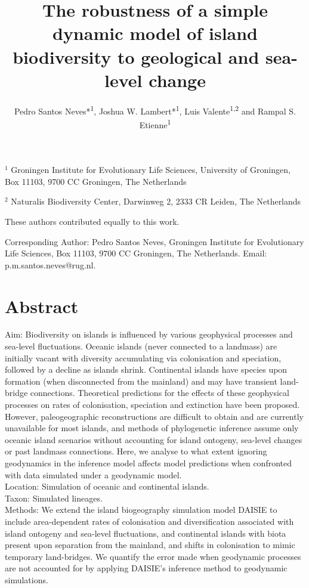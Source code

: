 \documentclass{article}
\title{The robustness of a simple dynamic model of island biodiversity to geological and sea-level change}
\author{Pedro Santos Neves*\textsuperscript{1}, Joshua W. Lambert*\textsuperscript{1}, Luis Valente\textsuperscript{1,2} and Rampal S. Etienne\textsuperscript{1}}
\date{}
\begin{document}
\maketitle

\noindent $^{1}$ Groningen Institute for Evolutionary Life Sciences, University of
Groningen, Box 11103, 9700 CC Groningen, The Netherlands

\noindent $^{2}$ Naturalis Biodiversity Center, Darwinweg 2, 2333 CR Leiden, The Netherlands 

\noindent * These authors contributed equally to this work.

\noindent Corresponding Author: Pedro Santos Neves, Groningen Institute for Evolutionary Life Sciences, Box 11103, 9700 CC Groningen, The Netherlands. Email: p.m.santos.neves@rug.nl.

\section*{Abstract}

Aim: Biodiversity on islands is influenced by various geophysical processes and sea-level fluctuations. Oceanic islands (never connected to a landmass) are initially vacant with diversity accumulating via colonisation and speciation, followed by a decline as islands shrink. Continental islands have species upon formation (when disconnected from the mainland) and may have transient land-bridge connections. Theoretical predictions for the effects of these geophysical processes on rates of colonisation, speciation and extinction have been proposed. However, paleogeographic reconstructions are difficult to obtain and are currently unavailable for most islands, and methods of phylogenetic inference assume only oceanic island scenarios without accounting for island ontogeny, sea-level changes or past landmass connections. Here, we analyse to what extent ignoring geodynamics in the inference model affects model predictions when confronted with data simulated under a geodynamic model. \\

\noindent Location: Simulation of oceanic and continental islands. \\

\noindent Taxon: Simulated lineages. \\

\noindent Methods: We extend the island biogeography simulation model DAISIE to include area-dependent rates of colonisation and diversification associated with island ontogeny and sea-level fluctuations, and continental islands with biota present upon separation from the mainland, and shifts in colonisation to mimic temporary land-bridges. We quantify the error made when geodynamic processes are not accounted for by applying DAISIE’s inference method to geodynamic simulations. \\
\end{document}

